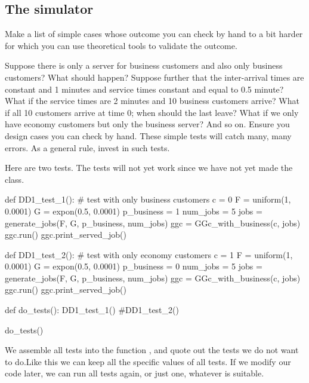 \subsection{The simulator}
\label{sec:simulator-1}

\begin{exercise}
  Make a list of  simple cases whose outcome you can check by hand to a bit harder for which  you can use theoretical tools to validate the outcome.
  \begin{hint}
Suppose there is only a server for business customers and also only business customers? What should happen? Suppose further that the inter-arrival times are constant and  1 minutes and service times constant and equal to 0.5 minute? What if the service times are 2 minutes and 10 business customers arrive? What if all 10 customers arrive at time 0; when should the last leave? What if we only have economy customers but only the business server? And so on. Ensure you design cases you can check by hand. These simple tests will catch many, many errors. As a general rule, invest in such tests. 
  \end{hint}
  

  \begin{solution}
Here are two tests. The tests will not yet work since we have not yet made the  class. 

    \begin{pyverbatim}
def DD1_test_1():
    # test with only business customers
    c = 0
    F = uniform(1, 0.0001)
    G = expon(0.5, 0.0001)
    p_business = 1
    num_jobs = 5
    jobs = generate_jobs(F, G, p_business, num_jobs)
    ggc = GGc_with_business(c, jobs)
    ggc.run()
    ggc.print_served_job()
    

def DD1_test_2():
    # test with only economy customers
    c = 1
    F = uniform(1, 0.0001)
    G = expon(0.5, 0.0001)
    p_business = 0
    num_jobs = 5
    jobs = generate_jobs(F, G, p_business, num_jobs)
    ggc = GGc_with_business(c, jobs)
    ggc.run()
    ggc.print_served_job()

def do_tests():
    DD1_test_1()
    #DD1_test_2()

do_tests()
    \end{pyverbatim}

  \end{solution}

We assemble all tests into the function , and quote out the tests we do not want to do.Like this we can keep all the specific values of all tests. If we modify our code later, we can run all tests again, or just  one, whatever is suitable. 
\end{exercise}


